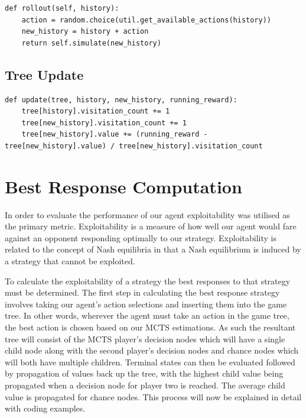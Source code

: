 \begin{lstlisting}[style=Python]
def rollout(self, history):
    action = random.choice(util.get_available_actions(history))
    new_history = history + action
    return self.simulate(new_history)
\end{lstlisting}

\subsection{Tree Update}\label{subsec:treeUpdate}

\begin{lstlisting}[style=Python]
def update(tree, history, new_history, running_reward):
    tree[history].visitation_count += 1
    tree[new_history].visitation_count += 1
    tree[new_history].value += (running_reward - tree[new_history].value) / tree[new_history].visitation_count
\end{lstlisting}

\section{Best Response Computation}\label{sec:bestResponseComputation}
In order to evaluate the performance of our agent exploitability was utilised as the primary metric.
Exploitability is a measure of how well our agent would fare against an opponent responding
optimally to our strategy.
Exploitability is related to the concept of Nash equilibria in that a Nash equilibrium
is induced by a strategy that cannot be exploited.

To calculate the exploitability of a strategy the best responses to that strategy must be
determined.
The first step in calculating the best response strategy involves
taking our agent's action selections and inserting them into the game tree\citep{heinrich2017reinforcement}.
In other words, wherever the agent must take an action in the game tree, the best action is chosen
based on our MCTS estimations.
As such the resultant tree will consist of the MCTS player's decision nodes which will have
a single child node along with the second player's decision nodes and chance nodes
which will both have multiple children.
Terminal states can then be evaluated followed by propagation of values back up the tree, with the highest
child value being propagated when a decision node for player two is reached.
The average child value is propagated for chance nodes.
This process will now be explained in detail with coding examples.

